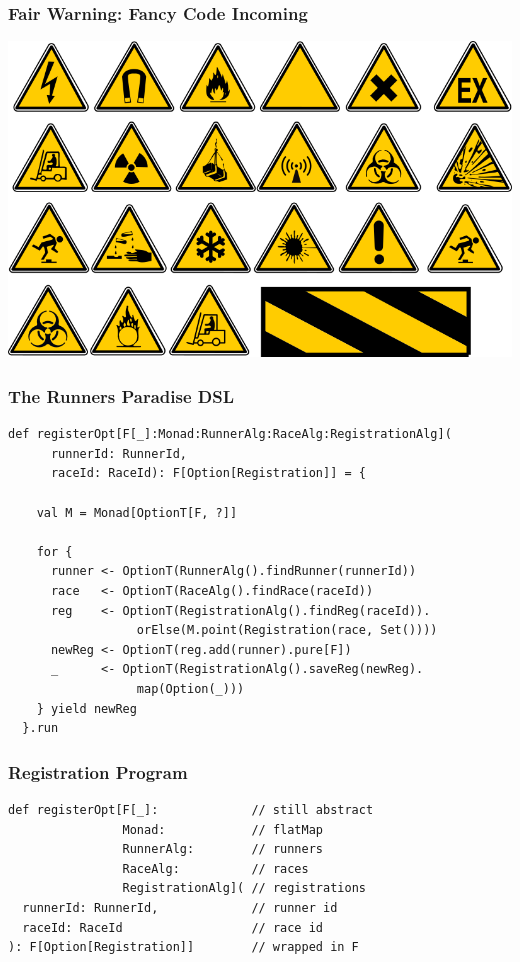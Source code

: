 \documentclass{beamer}
\begin{document}
\begin{frame}
  \frametitle{Fair Warning: Fancy Code Incoming}
  \includegraphics[width=\textwidth]{../pics/warning.png}
\end{frame}

\begin{frame}[fragile]
  \frametitle{The Runners Paradise DSL}
\begin{verbatim}
def registerOpt[F[_]:Monad:RunnerAlg:RaceAlg:RegistrationAlg](
      runnerId: RunnerId,
      raceId: RaceId): F[Option[Registration]] = {

    val M = Monad[OptionT[F, ?]]

    for {
      runner <- OptionT(RunnerAlg().findRunner(runnerId))
      race   <- OptionT(RaceAlg().findRace(raceId))
      reg    <- OptionT(RegistrationAlg().findReg(raceId)).
                  orElse(M.point(Registration(race, Set())))
      newReg <- OptionT(reg.add(runner).pure[F])
      _      <- OptionT(RegistrationAlg().saveReg(newReg).
                  map(Option(_)))
    } yield newReg
  }.run
\end{verbatim}
\end{frame}

\begin{frame}[fragile]
  \frametitle{Registration Program}
\begin{verbatim}
def registerOpt[F[_]:             // still abstract
                Monad:            // flatMap
                RunnerAlg:        // runners
                RaceAlg:          // races
                RegistrationAlg]( // registrations
  runnerId: RunnerId,             // runner id
  raceId: RaceId                  // race id
): F[Option[Registration]]        // wrapped in F
\end{verbatim}
\end{frame}
\end{document}
